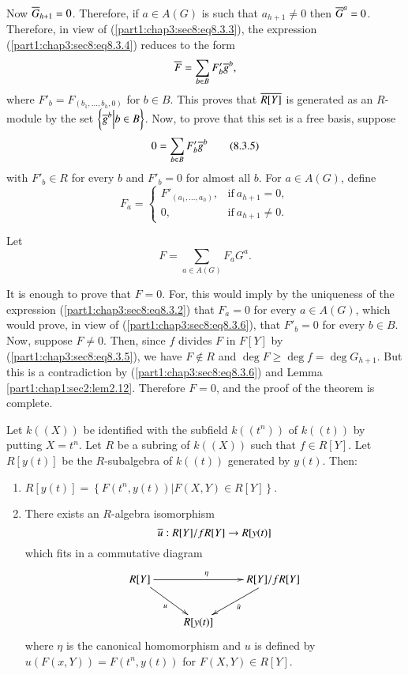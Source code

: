 Now $\overline{G}_{h+1}=0$. Therefore, if $a \in A (G)$ is such that $a_{h+1} \neq 0$ then $\overline{G}^a=0$. Therefore, in view of (\ref{part1:chap3:sec8:eq8.3.3}), the expression (\ref{part1:chap3:sec8:eq8.3.4}) reduces to the form
$$
\overline{F} = \sum_{b \in B} F'_b \overline{g}^b,
$$
where $F'_b = F_{(b_1, \ldots , b_{h}, 0)}$ for $b \in B$. This proves that $\overline{R[Y]}$ is generated as an $R$-module by the set $\left\{ \overline{g}^b \Big| b \in B \right\}$. Now, to prove that this set is a free basis, suppose
\begin{equation*}
  0 = \sum_{b \in B} F'_b \overline{g}^b \tag{8.3.5} \label{part1:chap3:sec8:eq8.3.5} 
\end{equation*}
with $F'_b \in R$ for every $b$ and $F'_b=0$ for almost all $b$. For $a \in A(G)$, define 
\begin{equation*}
  F_a = \begin{cases}
    F'_{(a_1, \ldots , a_h)}, & \text{if}~ a_{h+1}=0,\\
    0, & \text{if}~ a_{h+1} \neq 0.
  \end{cases} \tag{8.3.6} \label{part1:chap3:sec8:eq8.3.6}
\end{equation*}

Let\pageoriginale
$$
F= \sum_{a \in A (G)} F_a G^a.
$$

It is enough to prove that $F=0$. For, this would imply by the uniqueness of the expression (\ref{part1:chap3:sec8:eq8.3.2}) that $F_a=0$ for every $a \in A(G)$, which would prove, in view of (\ref{part1:chap3:sec8:eq8.3.6}), that $F'_b=0$ for every $b \in B$. Now, suppose $F \neq 0$. Then, since $f$ divides $F$ in $F[Y]$ by (\ref{part1:chap3:sec8:eq8.3.5}), we have $F \notin R$ and $\deg F \geq \deg f= \deg G_{h+1}$. But this is a contradiction by (\ref{part1:chap3:sec8:eq8.3.6}) and Lemma \ref{part1:chap1:sec2:lem2.12}. Therefore $F=0$, and the proof of the theorem is complete.

\setcounter{thm}{3}
\begin{lemma}\label{part1:chap3:sec8:lem8.4}
Let $k((X))$ be identified with the subfield $k((t^n))$ of $k((t))$ by putting $X=t^n$. Let $R$ be a subring of $k((X))$ such that $f \in R [Y]$. Let $R[y(t)]$ be the $R$-subalgebra of $k((t))$ generated by $y(t)$. Then:
\begin{enumerate}[\rm (i)]
\item $R[y(t)] = \left\{ F (t^n, y(t)) \Big| F(X, Y) \in R[Y] \right\}$.
\item There exists an $R$-algebra isomorphism
$$
\overline{u} : R[Y]/fR[Y] \to R[y(t)]
$$
which fits in a commutative diagram
\[
\xymatrix{R[Y]\ar[rr]^\eta\ar[dr]_u & & R[Y]/fR[Y]\ar[dl]^{\bar{u}}\\
 & R[y(t)] & 
}\]
\noindent where $\eta$ is the canonical homomorphism and $u$ is
defined by\break  $u (F(x, Y))= F(t^n, y(t))$ for $F(X, Y) \in R[Y]$. 
\end{enumerate}
\end{lemma}

